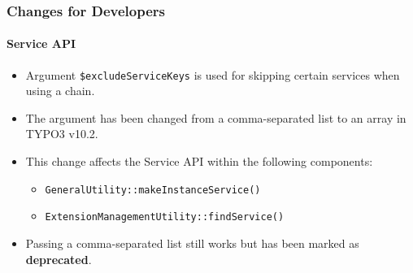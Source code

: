 \begin{frame}[fragile]
	\frametitle{Changes for Developers}
	\framesubtitle{Service API}

	\begin{itemize}
		\item Argument \texttt{\$excludeServiceKeys} is used for skipping certain services when using a chain.
		\item The argument has been changed from a comma-separated list to an array in TYPO3 v10.2.
		\item This change affects the Service API within the following components:

			\begin{itemize}
				\item \texttt{GeneralUtility::makeInstanceService()}
				\item \texttt{ExtensionManagementUtility::findService()}
			\end{itemize}

		\item Passing a comma-separated list still works but has been marked as \textbf{deprecated}.

	\end{itemize}

\end{frame}

